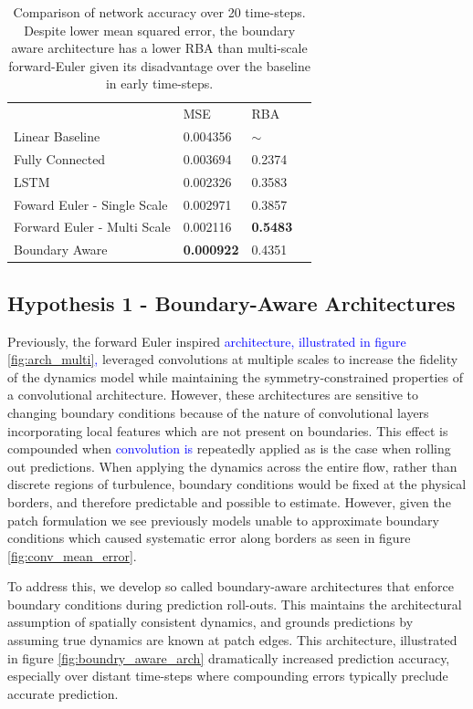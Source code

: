 \documentclass[12pt]{article}
\theoremstyle{plain}
\theoremstyle{remark}
\theoremstyle{definition}
\begin{document}
\begin{table}[]
	\centering
	\begin{tabular}{llll}
		& MSE       & RBA    &  \\
		Linear Baseline              & 0.004356  & $\sim$ &  \\
		Fully Connected              & 0.003694  & 0.2374 &  \\
		LSTM                         & 0.002326  & 0.3583 &  \\
		Foward Euler - Single Scale  & 0.002971  & 0.3857 &  \\
		Forward Euler - Multi Scale  & 0.002116  & \textbf{0.5483} &  \\
		Boundary Aware               & \textbf{0.000922}  & 0.4351 & 
	\end{tabular}
	\caption{Comparison of network accuracy over 20 time-steps. Despite lower mean squared error, the boundary aware architecture has a lower RBA than multi-scale forward-Euler given its disadvantage over the baseline in early time-steps.}
	\label{table:performance}
\end{table}

\subsection{Hypothesis 1 - Boundary-Aware Architectures}

Previously, the forward Euler inspired \textcolor{blue}{architecture, illustrated in figure \ref{fig:arch_multi},} leveraged convolutions at multiple scales to increase the fidelity of the dynamics model while maintaining the symmetry-constrained properties of a convolutional architecture. However, these architectures are sensitive to changing boundary conditions because of the nature of convolutional layers incorporating local features which are not present on boundaries. This effect is compounded when \textcolor{blue}{convolution is} repeatedly applied as is the case when rolling out predictions. When applying the dynamics across the entire flow, rather than discrete regions of turbulence, boundary conditions would be fixed at the physical borders, and therefore predictable and possible to estimate. However, given the patch formulation we see previously models unable to approximate boundary conditions which caused systematic error along borders as seen in figure \ref{fig:conv_mean_error}.

To address this, we develop so called boundary-aware architectures that enforce boundary conditions during prediction roll-outs. This maintains the architectural assumption of spatially consistent dynamics, and grounds predictions by assuming true dynamics are known at patch edges. This architecture, illustrated in figure \ref{fig:boundry_aware_arch} dramatically increased prediction accuracy, especially over distant time-steps where compounding errors typically preclude accurate prediction.
\end{document}
